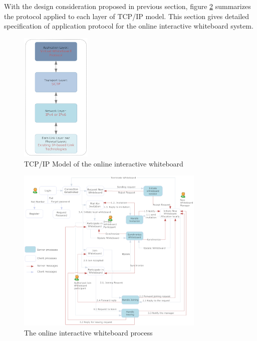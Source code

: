 \documentclass[conference]{IEEEtran}
\begin{document}
With the design consideration proposed in previous section, figure \ref{fig:4} summarizes the protocol applied to each layer of TCP/IP model. 
This section gives detailed specification of application protocol for the online interactive whiteboard system.
 
 \begin{figure}[h]
\begin{center}
\includegraphics[width=0.3\textwidth]{iw_tcpip.png}
\caption{TCP/IP Model of the online interactive whiteboard}
\label{fig:3}
\end{center}
\end{figure}
 \begin{figure}[t]
\begin{center}
\includegraphics[width=0.8\textwidth]{process}
\caption{The online interactive whiteboard process}
\label{fig:4}
\end{center}
\end{figure}
\end{document}
